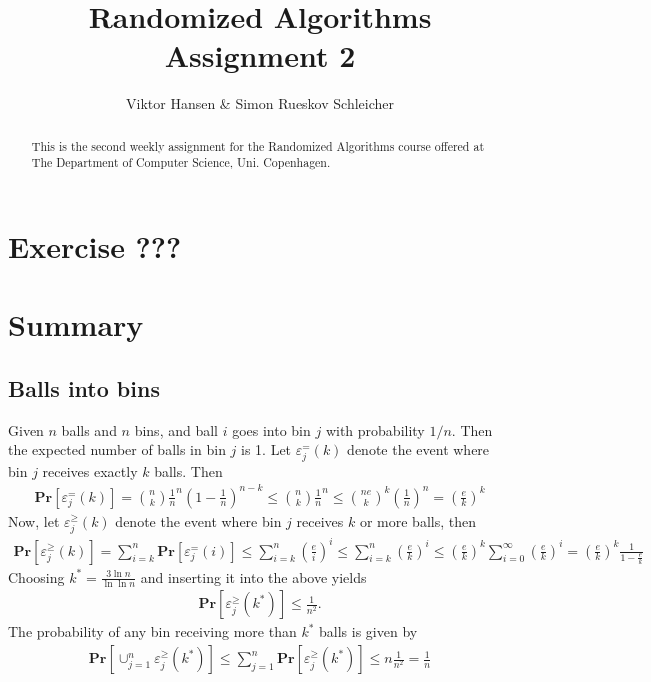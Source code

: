 \documentclass[12pt]{article}
\begin{document}
\nocite{*}


\title{Randomized Algorithms \\
       Assignment 2}

\author{Viktor Hansen \& Simon Rueskov Schleicher}

\maketitle

\begin{abstract}
  This is the second weekly assignment for the Randomized Algorithms course offered at The Department of Computer Science, Uni. Copenhagen.
\end{abstract}

\pagebreak

\section*{Exercise ???}

\pagebreak

\section{Summary}
\subsection{Balls into bins}
Given $n$ balls and $n$ bins, and ball $i$ goes into bin $j$ with probability $1/n$. Then the expected number of balls in bin $j$ is 1. Let $\varepsilon^=_j(k)$ denote the event where bin $j$ receives exactly $k$ balls. Then
\begin{align*}
\mathbf{Pr}\left[ \varepsilon^=_j(k) \right] = \binom{n}{k}\frac{1}{n}^n \left( 1-\frac{1}{n} \right)^{n-k} \leq \binom{n}{k}\frac{1}{n}^n \leq \binom{ne}{k}^k \left( \frac{1}{n} \right)^n = \left(\frac{e}{k}\right)^k 
\end{align*}
Now, let $\varepsilon^\geq_j(k)$ denote the event where bin $j$ receives $k$ or more balls, then
\begin{align*}
\mathbf{Pr}\left[ \varepsilon^\geq_j(k) \right] = \sum_{i=k}^{n} \mathbf{Pr}\left[ \varepsilon^=_j(i) \right] \leq \sum_{i=k}^{n} \left(\frac{e}{i}\right)^i \leq \sum_{i=k}^{n} \left(\frac{e}{k}\right)^i \leq \left(\frac{e}{k}\right)^k \sum_{i=0}^{\infty} \left( \frac{e}{k} \right)^i = \left( \frac{e}{k} \right)^k \frac{1}{1-\frac{e}{k}}
\end{align*}
Choosing $k^*=\frac{3 \ln n}{\ln \ln n}$ and inserting it into the above yields
\begin{align*}
\mathbf{Pr}\left[ \varepsilon_j^\geq(k^*) \right] \leq \frac{1}{n^2}.
\end{align*}
The probability of any bin receiving more than $k^*$ balls is given by
\begin{align*}
\mathbf{Pr}\left[ \cup_{j=1}^{n} \varepsilon_j^\geq(k^*) \right] \leq \sum_{j=1}^n \mathbf{Pr}\left[ \varepsilon_j^\geq(k^*) \right] \leq n \frac{1}{n^2} = \frac{1}{n}
\end{align*}
\end{document}

